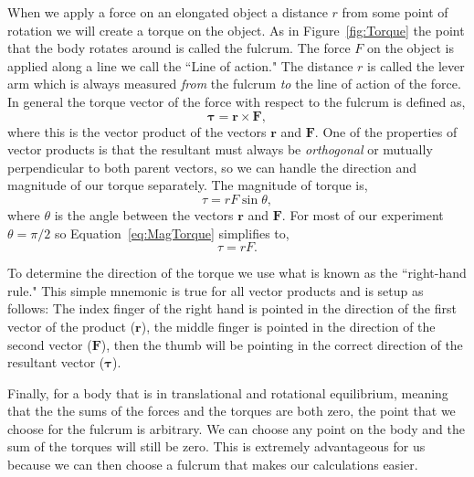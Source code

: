 \documentclass[main.tex]{subfiles}
\begin{document}
When we apply a force on an elongated object a distance $r$ from some point of rotation we will create a torque on the object. As in Figure~\ref{fig:Torque} the point that the body rotates around is called the fulcrum. The force $F$ on the object is applied along a line we call the ``Line of action." The distance $r$ is called the lever arm which is always measured \emph{from} the fulcrum \emph{to} the line of action of the force. In general the torque vector of the force with respect to the fulcrum is defined as,
\begin{equation} \label{eq:VectTorque}
\boldsymbol{\tau}=\mathbf{r} \times \mathbf{F},
\end{equation}
where this is the vector product of the vectors $\mathbf{r}$ and $\mathbf{F}.$ One of the properties of vector products is that the resultant must always be \emph{orthogonal} or mutually perpendicular to both parent vectors, so we can handle the direction and magnitude of our torque separately. The magnitude of torque is,
\begin{equation} \label{eq:MagTorque}
\tau=rF\sin\theta,
\end{equation}
where $\theta$ is the angle between the vectors $\mathbf{r}$ and $\mathbf{F}.$ For most of our experiment $\theta=\pi/2$ so Equation~\eqref{eq:MagTorque} simplifies to,
\begin{equation}
\tau=rF.
\end{equation}

To determine the direction of the torque we use what is known as the ``right-hand rule." This simple mnemonic is true for all vector products and is setup as follows: The index finger of the right hand is pointed in the direction of the first vector of the product ($\mathbf{r}$), the middle finger is pointed in the direction of the second vector ($\mathbf{F}$), then the thumb will be pointing in the correct direction of the resultant vector ($\boldsymbol{\tau}$).

Finally, for a body that is in translational and rotational equilibrium, meaning that the the sums of the forces and the torques are both zero, the point that we choose for the fulcrum is arbitrary. We can choose any point on the body and the sum of the torques will still be zero. This is extremely advantageous for us because we can then choose a fulcrum that makes our calculations easier.
\end{document}
